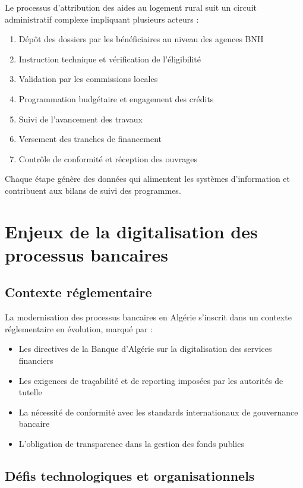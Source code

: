Le processus d'attribution des aides au logement rural suit un circuit administratif complexe impliquant plusieurs acteurs :

\begin{enumerate}
    \item Dépôt des dossiers par les bénéficiaires au niveau des agences BNH
    \item Instruction technique et vérification de l'éligibilité
    \item Validation par les commissions locales
    \item Programmation budgétaire et engagement des crédits
    \item Suivi de l'avancement des travaux
    \item Versement des tranches de financement
    \item Contrôle de conformité et réception des ouvrages
\end{enumerate}

Chaque étape génère des données qui alimentent les systèmes d'information et contribuent aux bilans de suivi des programmes.

\section{Enjeux de la digitalisation des processus bancaires}

\subsection{Contexte réglementaire}

La modernisation des processus bancaires en Algérie s'inscrit dans un contexte réglementaire en évolution, marqué par :

\begin{itemize}
    \item Les directives de la Banque d'Algérie sur la digitalisation des services financiers
    \item Les exigences de traçabilité et de reporting imposées par les autorités de tutelle
    \item La nécessité de conformité avec les standards internationaux de gouvernance bancaire
    \item L'obligation de transparence dans la gestion des fonds publics
\end{itemize}

\subsection{Défis technologiques et organisationnels}

